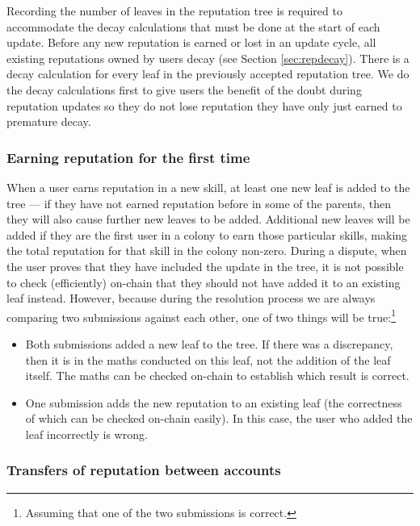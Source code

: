Recording the number of leaves in the reputation tree is required %
to accommodate the decay calculations that must be done at the start of each update. Before any new reputation is earned or lost in an update cycle, all existing reputations owned by users decay (see Section \ref{sec:repdecay}). There is a decay calculation for every leaf in the previously accepted reputation tree. We do the decay calculations first to give users the benefit of the doubt during reputation updates so they do not lose reputation they have only just earned to premature decay.

\subsubsection{Earning reputation for the first time}\label{sec:earning-rep-for-first-time}
When a user earns reputation in a new skill, at least one new leaf is added to the tree --- if they have not earned reputation before in some of the parents, then they will also cause further new leaves to be added. Additional new leaves will be added if they are the first user in a colony to earn those particular skills, making the total reputation for that skill in the colony non-zero. During a dispute, when the user proves that they have included the update in the tree, it is not possible to check (efficiently) on-chain that they should not have added it to an existing leaf instead. However, because during the resolution process we are always comparing two submissions against each other, one of two things will be true:\footnote{Assuming that one of the two submissions is correct.}
\begin{itemize}
 \item Both submissions added a new leaf to the tree. If there was a discrepancy, then it is in the maths conducted on this leaf, not the addition of the leaf itself. The maths can be checked on-chain to establish which result is correct.
 \item One submission adds the new reputation to an existing leaf (the correctness of which can be checked on-chain easily). In this case, the user who added the leaf incorrectly is wrong.
\end{itemize}

\subsubsection{Transfers of reputation between accounts}\label{sec:reptransfer}

